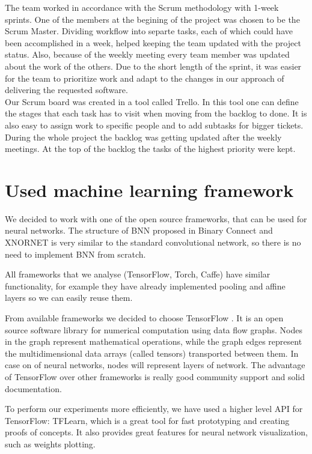 \documentclass[licencjacka]{pracamgr}
\begin{document}
	The team worked in accordance with the Scrum methodology with 1-week sprints. One of the members at the begining of the project was chosen to be the Scrum Master. Dividing workflow into separte tasks, each of which could have been accomplished in a week, helped keeping the team updated with the project status. Also, because of the weekly meeting every team member was updated about the work of the others. Due to the short length of the sprint, it was easier for the team to prioritize work and adapt to the changes in our approach of delivering the requested software.
\\
	Our Scrum board was created in a tool called Trello. In this tool one can define the stages that each task has to visit when moving from the backlog to done. It is also easy to assign work to specific people and to add subtasks for bigger tickets. During the whole project the backlog was getting updated after the weekly meetings. At the top of the backlog the tasks of the highest priority were kept.

	\section{Used machine learning framework}

		We decided to work with one of the open source frameworks, that can be used for neural networks. The structure of BNN proposed in Binary Connect \cite{binaryConnect} and XNORNET \cite{xnornet} is very similar to the standard convolutional network, so there is no need to implement BNN from scratch. 
	
		All frameworks that we analyse (TensorFlow, Torch, Caffe) have similar functionality, for example they have already implemented pooling and affine layers so we can easily reuse them. 

		From available frameworks we decided to choose TensorFlow \cite{tensorFlow}. It is an open source software library for numerical computation using data flow graphs. Nodes in the graph represent mathematical operations, while the graph edges represent the multidimensional data arrays (called tensors) transported between them. In case on of neural networks, nodes will represent layers of network. 
		The advantage of TensorFlow over other frameworks is really good community support and solid documentation.

		To perform our experiments more efficiently, we have used a higher level API for TensorFlow: TFLearn, which is a great tool for fast prototyping and creating proofs of concepts. It also provides great features for neural network visualization, such as weights plotting.
\end{document}
